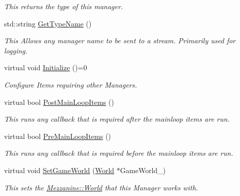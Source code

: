 \begin{DoxyCompactItemize}
\begin{DoxyCompactList}\small\item\em This returns the type of this manager. \item\end{DoxyCompactList}\item 
std::string \hyperlink{classMezzanine_1_1ManagerBase_afb2572589f8389155be7ce256c751d81}{GetTypeName} ()
\begin{DoxyCompactList}\small\item\em This Allows any manager name to be sent to a stream. Primarily used for logging. \item\end{DoxyCompactList}\item 
virtual void \hyperlink{classMezzanine_1_1ManagerBase_a864e3cac11928a602c1db28fa2d52ee2}{Initialize} ()=0
\begin{DoxyCompactList}\small\item\em Configure Items requiring other Managers. \item\end{DoxyCompactList}\item 
virtual bool \hyperlink{classMezzanine_1_1ManagerBase_a2a1bfb2a137c6013a8a5e5fae4c4bb85}{PostMainLoopItems} ()
\begin{DoxyCompactList}\small\item\em This runs any callback that is required after the mainloop items are run. \item\end{DoxyCompactList}\item 
virtual bool \hyperlink{classMezzanine_1_1ManagerBase_a9e0f19b5472eab47fbcd986656838070}{PreMainLoopItems} ()
\begin{DoxyCompactList}\small\item\em This runs any callback that is required before the mainloop items are run. \item\end{DoxyCompactList}\item 
virtual void \hyperlink{classMezzanine_1_1ManagerBase_acb66b1edbb0f256fb1d4d4d2126f073e}{SetGameWorld} (\hyperlink{classMezzanine_1_1World}{World} $\ast$GameWorld\_\-)
\begin{DoxyCompactList}\small\item\em This sets the \hyperlink{classMezzanine_1_1World}{Mezzanine::World} that this Manager works with. \item\end{DoxyCompactList}\item 

\end{DoxyCompactItemize}
